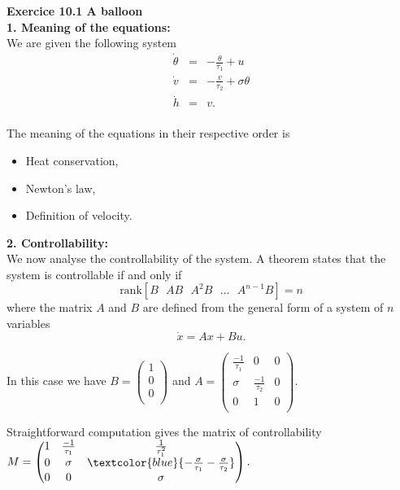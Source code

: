 
\textbf{Exercice 10.1 A balloon}\\


\textbf{1. Meaning of the equations:}\\

We are given the following system
$$\begin{array}{lll}
\dot{\theta} & = & -\frac{\theta}{\tau_{1}}+u\\
\dot{v} & = & -\frac{v}{\tau_{2}}+\sigma\theta \\
\dot{h} & = & v.\\
\end{array}$$

The meaning of the equations in their respective order is
\begin{itemize}
\item Heat conservation,
\item Newton's law,
\item Definition of velocity.\\\end{itemize}


\textbf{2. Controllability:}\\

We now analyse the controllability of the system. A theorem states that the system is controllable if and only if 
$$\text{rank}[B \text{  } AB\text{  } A^{2}B \text{  }\dots\text{  } A^{n-1}B]=n$$
where the matrix $A$ and $B$ are defined from the general form of a system of $n$ variables
$$\dot{x}=Ax+Bu.$$

In this case we have $B=\begin{pmatrix}
1\\
0\\
0\\
\end{pmatrix}$ and $A=\begin{pmatrix}
\frac{-1}{\tau_{1}} & 0 & 0\\
\sigma & \frac{-1}{\tau_{2}} & 0 \\
0 & 1 & 0 \\
\end{pmatrix}.$

Straightforward computation gives the matrix of controllability $M=\begin{pmatrix}
1      & \frac{-1}{\tau_{1}} & \frac{1}{\tau_{1}^{2}}\\
0 & \sigma & \textcolor{blue}{-\frac{\sigma}{\tau_{1}}-\frac{\sigma}{\tau_{2}}} \\
0      & 0 & \sigma \\
\end{pmatrix}.$

